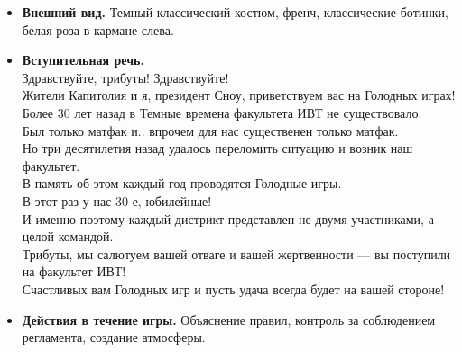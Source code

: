 
\begin{itemize}
\item \textbf{Внешний вид.} Темный классический костюм, френч, классические ботинки, белая роза в кармане слева.

\item \textbf{Вступительная речь.}\\
Здравствуйте, трибуты! Здравствуйте!\\
Жители Капитолия и я, президент Сноу, приветствуем вас на Голодных играх!\\
Более 30 лет назад в Темные времена факультета ИВТ не существовало.\\
Был только матфак и.. впрочем для нас существенен только матфак.\\
Но три десятилетия назад удалось переломить ситуацию и возник наш факультет.\\
В память об этом каждый год проводятся Голодные игры.\\
В этот раз у нас 30-е, юбилейные!\\
И именно поэтому каждый дистрикт представлен не двумя участниками, а целой командой.\\
Трибуты, мы салютуем вашей отваге и вашей жертвенности --- вы поступили на факультет ИВТ!\\
Счастливых вам Голодных игр и пусть удача всегда будет на вашей стороне!

\item \textbf{Действия в течение игры.} Объяснение правил, контроль за соблюдением регламента, создание атмосферы.
\end{itemize}